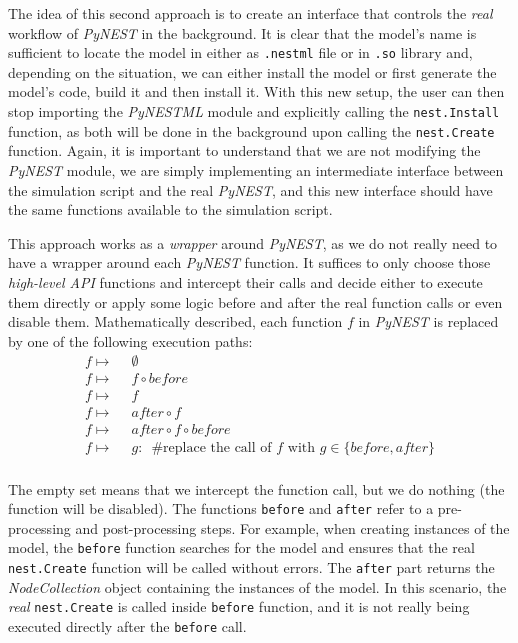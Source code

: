 The idea of this second approach is to create an interface that controls the \emph{real} workflow of \emph{PyNEST} in the background. It is clear that the model's name is sufficient to locate the model in either as \texttt{.nestml} file or in \texttt{.so} library and, depending on the situation, we can either install the model or first generate the model's code, build it and then install it. With this new setup, the user can then stop importing the \emph{PyNESTML} module and explicitly calling the \texttt{nest.Install} function, as both will be done in the background upon calling the \texttt{nest.Create} function. Again, it is important to understand that we are not modifying the \emph{PyNEST} module, we are simply implementing an intermediate interface between the simulation script and the real \emph{PyNEST}, and this new interface should have the same functions available to the simulation script.



This approach works as a \emph{wrapper} around \emph{PyNEST}, as we do not really need to have a wrapper around each \emph{PyNEST} function. It suffices to only choose those \emph{high-level API} functions and intercept their calls and decide either to execute them directly or apply some logic before and after the real function calls or even disable them.  Mathematically described, each function $f$ in \emph{PyNEST} is replaced by one of the following execution paths:
\begin{align*} 
f \mapsto&\enspace\emptyset\\
f \mapsto&\enspace f \circ before \\
f \mapsto&\enspace f \\
f \mapsto&\enspace after \circ f \\
f \mapsto&\enspace after \circ f \circ before\\
f \mapsto&\enspace g:\enspace \text{\#replace the call of } f \text{ with } g \in \{before, after\}  \\
\end{align*}


The empty set means that we intercept the function call, but we do nothing (the function will be disabled). The functions \texttt{before} and \texttt{after} refer to a pre-processing and post-processing steps. For example, when creating instances of the model, the \texttt{before} function searches for the model and ensures that the real \texttt{nest.Create} function will be called without errors. The \texttt{after} part returns the \emph{NodeCollection} object containing the instances of the model. In this scenario, the \emph{real} \texttt{nest.Create} is called inside \texttt{before} function, and it is not really being executed directly after the \texttt{before} call. 

